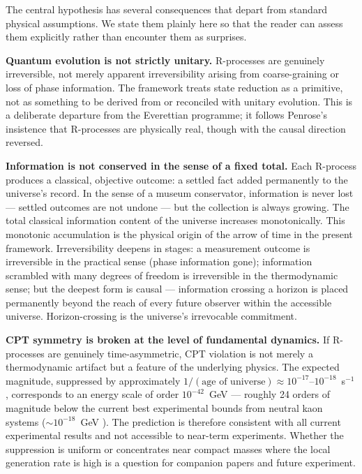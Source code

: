 \documentclass[12pt]{article}
\begin{document}
The central hypothesis has several consequences that depart from
standard physical assumptions.
We state them plainly here so that the reader can assess them
explicitly rather than encounter them as surprises.

\medskip
\noindent\textbf{Quantum evolution is not strictly unitary.}
R-processes are genuinely irreversible, not merely apparent
irreversibility arising from coarse-graining or loss of phase
information.
The framework treats state reduction as a primitive, not as something
to be derived from or reconciled with unitary evolution.
This is a deliberate departure from the Everettian programme; it
follows Penrose's insistence that R-processes are physically real,
though with the causal direction reversed.

\medskip
\noindent\textbf{Information is not conserved in the sense of a
fixed total.}
Each R-process produces a classical, objective outcome: a settled
fact added permanently to the universe's record.
In the sense of a museum conservator, information is never lost ---
settled outcomes are not undone --- but the collection is always
growing.
The total classical information content of the universe increases
monotonically.
This monotonic accumulation is the physical origin of the arrow of
time in the present framework.
Irreversibility deepens in stages: a measurement outcome is
irreversible in the practical sense (phase information gone);
information scrambled with many degrees of freedom is irreversible
in the thermodynamic sense; but the deepest form is causal ---
information crossing a horizon is placed permanently beyond the reach
of every future observer within the accessible universe.
Horizon-crossing is the universe's irrevocable commitment.

\medskip
\noindent\textbf{CPT symmetry is broken at the level of fundamental
dynamics.}
If R-processes are genuinely time-asymmetric, CPT violation is not
merely a thermodynamic artifact but a feature of the underlying
physics.
The expected magnitude, suppressed by approximately
$1/(\text{age of universe}) \approx 10^{-17}$--$10^{-18}$~s$^{-1}$,
corresponds to an energy scale of order $10^{-42}$~GeV --- roughly
24 orders of magnitude below the current best experimental bounds
from neutral kaon systems ($\sim 10^{-18}$~GeV \cite{PDG2024}).
The prediction is therefore consistent with all current experimental
results and not accessible to near-term experiments.
Whether the suppression is uniform or concentrates near compact masses
where the local generation rate is high is a question for companion
papers and future experiment.
\end{document}
